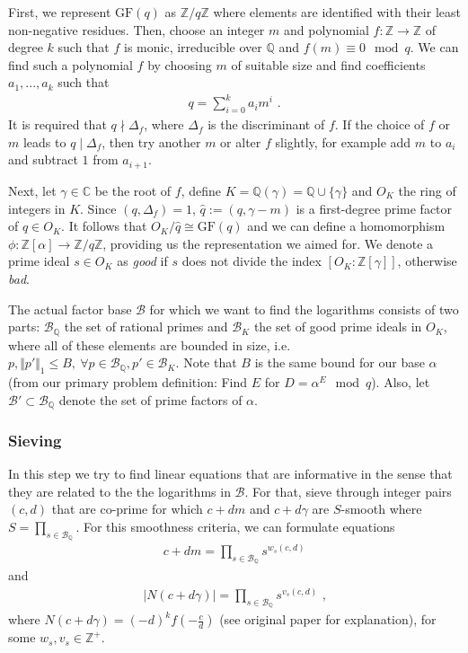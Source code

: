 \documentclass[paper=a4, fontsize=11pt]{scrartcl} %
\numberwithin{equation}{section} %
\numberwithin{figure}{section} %
\numberwithin{table}{section} %
\begin{document}
First, we represent $\mathrm{GF}(q)$ as $\mathbb{Z}/q\mathbb{Z}$ where elements are identified with their least non-negative residues. Then, choose an integer $m$ and polynomial $f:\mathbb{Z}\rightarrow\mathbb{Z}$ of degree $k$ such that $f$ is monic, irreducible over $\mathbb{Q}$ and $f(m)\equiv 0 \mod q$. We can find such a polynomial $f$ by choosing $m$ of suitable size and find coefficients $a_1,...,a_k$ such that
\begin{eqnarray}
q = \sum_{i=0}^{k}a_im^i
\text{ .}
\end{eqnarray}
It is required that $q\nmid\Delta_f$, where $\Delta_f$ is the discriminant of $f$. If the choice of $f$ or $m$ leads to $q\mid\Delta_f$, then try another $m$ or alter $f$ slightly, for example add $m$ to $a_i$ and subtract $1$ from $a_{i+1}$.

Next, let $\gamma\in\mathbb{C}$ be the root of $f$, define $K = \mathbb{Q}(\gamma) = \mathbb{Q}\cup\{\gamma\}$ and $O_K$ the ring of integers in $K$. Since $(q,\Delta_f) = 1$, $\hat{q}:=(q,\gamma-m)$ is a first-degree prime factor of $q\in O_K$. It follows that $O_K/\hat{q}\cong\mathrm{GF}(q)$ and we can define a homomorphism $\phi:\mathbb{Z}[\alpha]\rightarrow\mathbb{Z}/q\mathbb{Z}$, providing us the representation we aimed for. We denote a prime ideal $s\in O_K$ as \textit{good} if $s$ does not divide the index $[O_K:\mathbb{Z}[\gamma]]$, otherwise \textit{bad}.

The actual factor base $\mathcal{B}$ for which we want to find the logarithms consists of two parts: $\mathcal{B}_\mathbb{Q}$ the set of rational primes and $\mathcal{B}_K$ the set of good prime ideals in $O_K$, where all of these elements are bounded in size, i.e. $p,\Vert p'\Vert_1\leq B,\ \forall p\in\mathcal{B}_\mathbb{Q},p'\in\mathcal{B}_K$. Note that $B$ is the same bound for our base $\alpha$ (from our primary problem definition: Find $E$ for $D=\alpha^E\mod q$). Also, let $\mathcal{B}'\subset\mathcal{B}_\mathbb{Q}$ denote the set of prime factors of $\alpha$.

\subsubsection{Sieving}
In this step we try to find linear equations that are informative in the sense that they are related to the the logarithms in $\mathcal{B}$. For that, sieve through integer pairs $(c,d)$ that are co-prime for which $c+dm$ and $c+d\gamma$ are $S$-smooth where $S = \prod_{s\in\mathcal{B}_\mathbb{Q}}$. For this smoothness criteria, we can formulate equations
\begin{eqnarray}
c+dm = \prod_{s\in\mathcal{B}_\mathbb{Q}}s^{w_s(c,d)}
\end{eqnarray}
and
\begin{eqnarray}
|N(c+d\gamma)| = \prod_{s\in\mathcal{B}_\mathbb{Q}}s^{v_s(c,d)}
\text{ ,}
\end{eqnarray}
where $N(c+d\gamma) = (-d)^kf(-\frac{c}{d})$ (see original paper \citep{gordon1993discrete} for explanation), for some $w_s,v_s\in\mathbb{Z}^+$.
\end{document}
